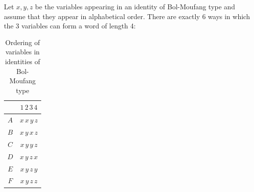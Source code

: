 \documentclass[11pt]{amsart}
\theoremstyle{definition}
\begin{document}
Let $x,y,z$ be the variables appearing in an identity of Bol-Moufang type and assume that they appear in alphabetical order. There are exactly 6 ways in which the 3 variables can form a word of length 4:

\begin{table}[hbt]    
\begin{center}
\begin{tabular}{c|c}
    & $1\,2\,3\,4$ \\
    \hline
    $A$ & $x\,x\,y\,z$ \\
    $B$ & $x\,y\,x\,z$ \\
    $C$ & $x\,y\,y\,z$ \\
    $D$ & $x\,y\,z\,x$ \\
    $E$ & $x\,y\,z\,y$ \\
    $F$ & $x\,y\,z\,z$ \\

\end{tabular}
\end{center}
\caption{ Ordering of variables in identities of Bol-Moufang type}\label{T:id}
\end{table}
\end{document}
